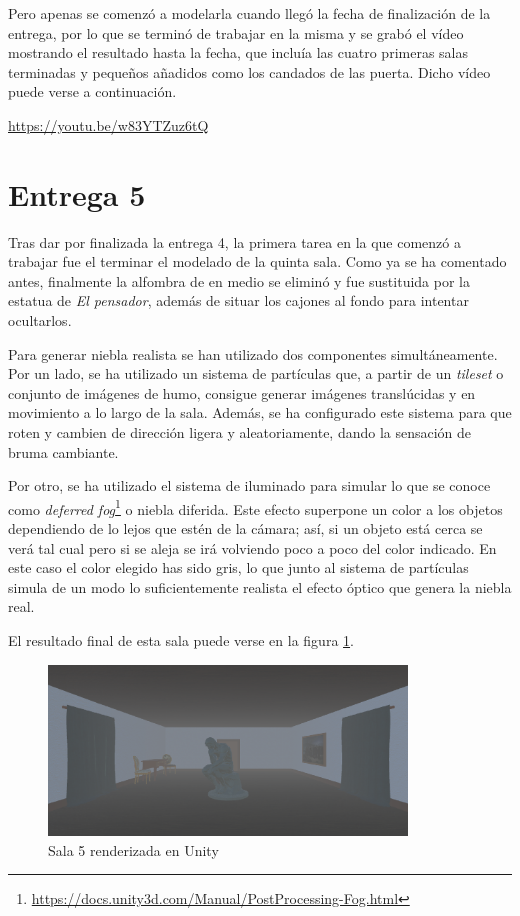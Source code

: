 Pero apenas se comenzó a modelarla cuando llegó la fecha de finalización de la entrega, por lo que se terminó de trabajar en la misma y se grabó el vídeo mostrando el resultado hasta la fecha, que incluía las cuatro primeras salas terminadas y pequeños añadidos como los candados de las puerta. Dicho vídeo puede verse a continuación.

\begin{center}
    \url{https://youtu.be/w83YTZuz6tQ}
\end{center}



\section{Entrega 5}

Tras dar por finalizada la entrega 4, la primera tarea en la que comenzó a trabajar fue el terminar el modelado de la quinta sala. Como ya se ha comentado antes, finalmente la alfombra de en medio se eliminó y fue sustituida por la estatua de \textit{El pensador}, además de situar los cajones al fondo para intentar ocultarlos. 

Para generar niebla realista se han utilizado dos componentes simultáneamente. Por un lado, se ha utilizado un sistema de partículas  que, a partir de un \textit{tileset} o conjunto de imágenes de humo, consigue generar imágenes translúcidas y en movimiento a lo largo de la sala. Además, se ha configurado este sistema para que roten y cambien de dirección ligera y aleatoriamente, dando la sensación de bruma cambiante. 

Por otro, se ha utilizado el sistema de iluminado para simular lo que se conoce como \textit{deferred fog}\footnote{\url{https://docs.unity3d.com/Manual/PostProcessing-Fog.html}} o niebla diferida. Este efecto superpone un color a los objetos dependiendo de lo lejos que estén de la cámara; así, si un objeto está cerca se verá tal cual pero si se aleja se irá volviendo poco a poco del color indicado. En este caso el color elegido has sido gris, lo que junto al sistema de partículas simula de un modo lo suficientemente realista el efecto óptico que genera la niebla real.

El resultado final de esta sala puede verse en la figura \ref{fig:unity-sala-5}.

\begin{figure}[!h]
\begin{center}
\includegraphics[width=0.85\textwidth]{imagenes/7/salas-unity/unity-sala-5.png}
\caption{Sala 5 renderizada en Unity}
\label{fig:unity-sala-5}
\end{center}
\end{figure}

